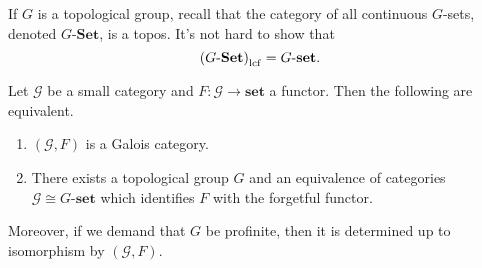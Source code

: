 If $G$ is a topological group, recall  that the category of all continuous $G$-sets, denoted $G\text{-}\mathbf{Set}$, is a topos. It's not hard to show that
\[ \left(G\text{-}\mathbf{Set}\right)_{\operatorname{lcf}} = G\text{-}\mathbf{set}. \]

\begin{theorem}[Grothendieck]
\label{thm:groth GF is galois cat iff there is a topological group G and an equiv of cats to finite G sets}
Let $\mathscr{G}$ be a small category and $F : \mathscr{G} \to \mathbf{set}$ a functor. Then the following are equivalent.
\begin{enumerate}
	\item $(\mathscr{G},F)$ is a Galois category.
	\item There exists a topological group $G$ and an equivalence of categories $\mathscr{G} \cong G\text{-}\mathbf{set}$ which identifies $F$ with the forgetful functor.
\end{enumerate}
Moreover, if we demand that $G$ be profinite, then it is determined up to isomorphism by $(\mathscr{G},F)$.
\end{theorem}
